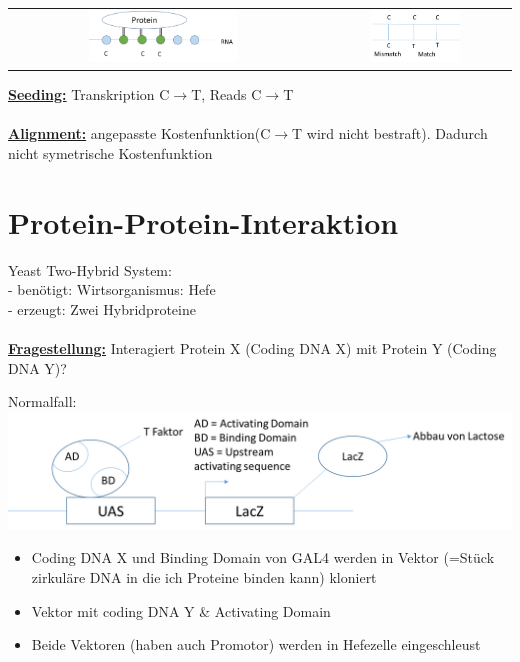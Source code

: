 \begin{tabular}{cc}
\includegraphics[width=0.5\textwidth]{lectures/160429/pix/par_clip1.png} & \includegraphics[width=0.5\textwidth]{lectures/160429/pix/par_clip2.png}
\end{tabular}

\textbf{\underline{Seeding:}} Transkription C$\rightarrow$T, Reads C$\rightarrow$T\\\\
\textbf{\underline{Alignment:}} angepasste Kostenfunktion(C$\rightarrow$T wird nicht bestraft). Dadurch nicht symetrische Kostenfunktion
\newpage
\section{Protein-Protein-Interaktion}
Yeast Two-Hybrid System:\\
 - benötigt: Wirtsorganismus: Hefe\\
 - erzeugt: Zwei Hybridproteine
\\\\ 
\textbf{\underline{Fragestellung:}} Interagiert Protein X (Coding DNA X) mit Protein Y (Coding DNA Y)?

Normalfall:\\
\includegraphics[width=1\textwidth]{lectures/160429/pix/ppi1.png}
\begin{itemize}
	\item Coding DNA X und Binding Domain von GAL4 werden in Vektor (=Stück zirkuläre DNA in die ich Proteine binden kann) kloniert
	\item Vektor mit coding DNA Y \& Activating Domain
	\item Beide Vektoren (haben auch Promotor) werden in Hefezelle eingeschleust
\end{itemize}


